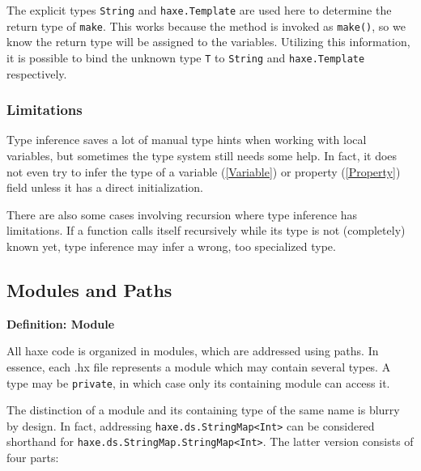 \documentclass{article}
\newcommand{\type}[1]{\texttt{#1}}
\newcommand{\expr}[1]{\texttt{#1}}
\newenvironment{myshaded}
  {\def\FrameCommand{\fboxsep=\topsep\colorbox{bgcolor}}%
  \MakeFramed {\advance\hsize-\width \FrameRestore}}%
 {\endMakeFramed}
\newcommand{\define}[3][Definition]
	{\begin{myshaded}\noindent\textbf{#1: #2}\par\nobreak\noindent\ignorespaces#3\label{def:#2}\end{myshaded}}
\newcommand{\tref}[2]{#1 (\ref{#2})}
\begin{document}


The explicit types \type{String} and \type{haxe.Template} are used here to determine the return type of \expr{make}. This works because the method is invoked as \expr{make()}, so we know the return type will be assigned to the variables. Utilizing this information, it is possible to bind the unknown type \type{T} to \type{String} and \type{haxe.Template} respectively.


%



\subsubsection{Limitations}

Type inference saves a lot of manual type hints when working with local variables, but sometimes the type system still needs some help. In fact, it does not even try to infer the type of a \tref{variable}{Variable} or \tref{property}{Property} field unless it has a direct initialization.

There are also some cases involving recursion where type inference has limitations. If a function calls itself recursively while its type is not (completely) known yet, type inference may infer a wrong, too specialized type.




\subsection{Modules and Paths}
\label{Modules and Paths}

\define{Module}{All haxe code is organized in modules, which are addressed using paths. In essence, each .hx file represents a module which may contain several types. A type may be \expr{private}, in which case only its containing module can access it.}

The distinction of a module and its containing type of the same name is blurry by design. In fact, addressing \expr{haxe.ds.StringMap<Int>} can be considered shorthand for \expr{haxe.ds.StringMap.StringMap<Int>}. The latter version consists of four parts:
\end{document}
